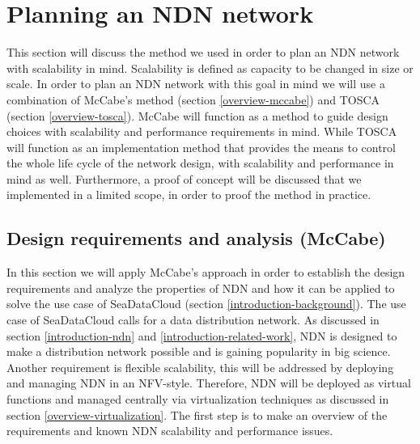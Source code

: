 \section{Planning an NDN network}
\label{planning-ndn}
This section will discuss the method we used in order to plan an NDN network with scalability in mind. Scalability is defined as capacity to be changed in size or scale. In order to plan an NDN network with this goal in mind we will use a combination of McCabe's method (section \ref{overview-mccabe}) and TOSCA (section \ref{overview-tosca}). McCabe will function as a method to guide design choices with scalability and performance requirements in mind. While TOSCA will function as an implementation method that provides the means to control the whole life cycle of the network design, with scalability and performance in mind as well. Furthermore, a proof of concept will be discussed that we implemented in a limited scope, in order to proof the method in practice.

\subsection{Design requirements and analysis (McCabe)}
\label{planning-requirements}
In this section we will apply McCabe's approach in order to establish the design requirements and analyze the properties of NDN and how it can be applied to solve the use case of SeaDataCloud (section \ref{introduction-background}). The use case of SeaDataCloud calls for a data distribution network. As discussed in section \ref{introduction-ndn} and \ref{introduction-related-work}, NDN is designed to make a distribution network possible and is gaining popularity in big science. Another requirement is flexible scalability, this will be addressed by deploying and managing NDN in an NFV-style. Therefore, NDN will be deployed as virtual functions and managed centrally via virtualization techniques as discussed in section \ref{overview-virtualization}. The first step is to make an overview of the requirements and known NDN scalability and performance issues.

